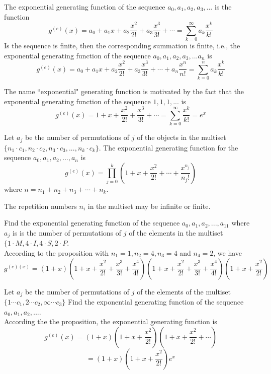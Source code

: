 \documentclass[handout]{ximera}
\begin{document}
\begin{definition}
The exponential generating function of the sequence $a_0, a_1, a_2, a_3, ...$ is the function
\[
g^{(e)}(x) = a_0 + a_1x + a_2\frac{x^2}{2!} + a_3\frac{x^3}{3!} + \cdots = \sum_{k=0}^\infty a_k \frac{x^k}{k!}
\]
Is the sequence is finite, then the corresponding summation is finite, i.e., the exponential generating function of the sequence
$a_0, a_1, a_2, a_3, ...a_n$ is
\[
g^{(e)}(x) = a_0 + a_1x + a_2\frac{x^2}{2!} + a_3\frac{x^3}{3!} + \cdots  + a_n\frac{x^n}{n!} = \sum_{k=0}^n a_k \frac{x^k}{k!}
\]
\end{definition}

\begin{remark} The name ``exponential" generating function is motivated by the fact that the exponential generating function of the sequence $1, 1, 1, ...$ is
\[
g^{(e)}(x) = 1 + x + \frac{x^2}{2!} + \frac{x^3}{3!} + \cdots = \sum_{k=0}^\infty \frac{x^k}{k!} = e^x
\]
\end{remark}

\begin{proposition}
Let $a_j$ be the number of permutations of $j$ of the objects in the multiset $\{n_1 \cdot c_1, n_2 \cdot c_2, n_3 \cdot c_3, ..., n_k \cdot c_k\}$.
The exponential generating function for the sequence $a_0, a_1, a_2, ..., a_n$ 
is 
\[
g^{(e)}(x) = \prod_{j=0}^k \left(1 + x + \frac{x^2}{2!} + \cdots + \frac{x^{n_j}}{n_j !}\right)
\]
where $n = n_1 + n_2 + n_3 + \cdots + n_k$.
\end{proposition}
\begin{remark}
The repetition numbers $n_i$ in the multiset may be infinite or finite.
\end{remark}

\begin{example}[example 1] 
Find the exponential generating function of the sequence $a_0, a_1, a_2, ..., a_{11}$ where $a_j$ is is the number of 
permutations of $j$ of the elements in the multiset $\{1\cdot M, 4\cdot I, 4\cdot S, 2\cdot P$.\\
According to the proposition with $n_1 = 1, n_2 = 4, n_3 = 4$ and $n_4 = 2$, we have
\[
g^{(e)(x)} = \left(1+x\right)\left(1+x+\frac{x^2}{2!} + \frac{x^3}{3!} + \frac{x^4}{4!}\right)\left(1+x+\frac{x^2}{2!} + \frac{x^3}{3!} + \frac{x^4}{4!}\right)
\left(1+x+\frac{x^2}{2!}\right)
\]
\end{example}

\begin{example}[example 2]
Let $a_j$ be the number of permutations of $j$ of the elements of the multiset $\{1 \cdots c_1, 2 \cdots c_2, \infty \cdots c_3\}$
Find the exponential generating function of the sequence $a_0, a_1, a_2, ...$.\\
According the the proposition, the exponential generating function is
\[
g^{(e)}(x) = (1+x)\left(1 + x + \frac{x^2}{2!}\right)\left(1 + x + \frac{x^2}{2!} + \cdots \right)
\]
\[
= (1+x)\left(1 + x + \frac{x^2}{2!}\right)e^x
\]
\end{example}
\end{document}
